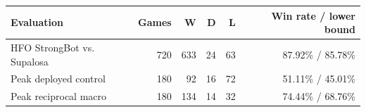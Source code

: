 
\begin{tabular}{@{}lrrrrr@{}}
\toprule
Evaluation & Games & W & D & L & Win rate / lower bound \\
\midrule
HFO StrongBot vs. Supalosa & 720 & 633 & 24 & 63 &
  87.92\% / 85.78\% \\
Peak deployed control & 180 & 92 & 16 &
  72 & 51.11\% / 45.01\% \\
Peak reciprocal macro & 180 & 134 & 14 & 32 &
  74.44\% / 68.76\% \\
\bottomrule
\end{tabular}

